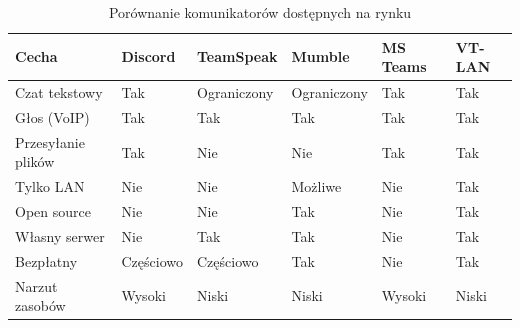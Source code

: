 \begin{table}[H]
	\centering
	\caption{Porównanie komunikatorów dostępnych na rynku}
	\label{tab:rynek_porownanie}
	\begin{tabularx}{\textwidth}{|l|X|X|X|X|X|}
		\hline
		\textbf{Cecha} & \textbf{Discord} & \textbf{TeamSpeak} & \textbf{Mumble}
		& \textbf{MS Teams} & \textbf{VT-LAN} \\
		\hline
		Czat tekstowy       & Tak  & Ograniczony & Ograniczony & Tak  & Tak \\
		\hline
		Głos (VoIP)         & Tak  & Tak         & Tak         & Tak  & Tak \\
		\hline
		Przesyłanie plików  & Tak  & Nie         & Nie         & Tak  & Tak \\
		\hline
		Tylko LAN           & Nie  & Nie         & Możliwe     & Nie  & Tak \\
		\hline
		Open source         & Nie  & Nie         & Tak         & Nie  & Tak \\
		\hline
		Własny serwer       & Nie  & Tak         & Tak         & Nie  & Tak \\
		\hline
		Bezpłatny           & Częściowo & Częściowo & Tak    & Nie  & Tak \\
		\hline
		Narzut zasobów      & Wysoki & Niski     & Niski       & Wysoki & Niski \\
		\hline
	\end{tabularx}
\end{table}
